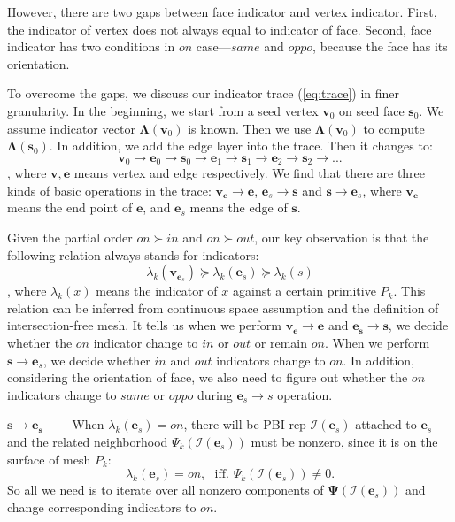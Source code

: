\documentclass[10pt,journal,compsoc]{IEEEtran}
\begin{document}
However, there are two gaps between face indicator and vertex indicator. First, the indicator of vertex does not always equal to indicator of face. Second, face indicator has two conditions in $on$ case---$same$ and $oppo$, because the face has its orientation.

To overcome the gaps, we discuss our indicator trace (\ref{eq:trace}) in finer granularity. In the beginning, we start from a seed vertex $\bm{v}_0$ on seed face $\bm{s}_0$. We assume indicator vector $\bm{\Lambda}(\bm{v}_0)$ is known. Then we use $\bm{\Lambda}(\bm{v}_0)$ to compute $\bm{\Lambda}(\bm{s}_0)$. In addition, we add the edge layer into the trace. Then it changes to:
\begin{equation}
\bm{v}_0\to \bm{e}_0\to \bm{s}_0\to \bm{e}_1\to \bm{s}_1\to \bm{e}_2\to \bm{s}_2\to ...
\end{equation}
, where $\bm{v}, \bm{e}$ means vertex and edge respectively. We find that there are three kinds of basic operations in the trace: $\bm{v}_{\bm{e}}\to \bm{e}$, $\bm{e}_s\to \bm{s}$ and $\bm{s}\to \bm{e}_s$, where $\bm{v}_{\bm{e}}$ means the end point of $\bm{e}$, and $\bm{e}_s$ means the edge of $\bm{s}$.

Given the partial order $on \succ in$ and $on \succ out$, our key observation is that the following relation always stands for indicators:
\begin{equation}
\label{eq:porder}
\lambda_k(\bm{v}_{\bm{e}_s}) \succeq \lambda_k(\bm{e}_s) \succeq \lambda_k(s)
\end{equation}
, where $\lambda_k(x)$ means the indicator of $x$ against a certain primitive $P_k$. This relation can be inferred from continuous space assumption and the definition of intersection-free mesh. It tells us when we perform $\bm{v}_{\bm{e}}\to \bm{e}$ and $\bm{e}_{\bm{s}}\to \bm{s}$, we decide whether the $on$ indicator change to $in$ or $out$ or remain $on$. When we perform $\bm{s}\to \bm{e}_s$, we decide whether $in$ and $out$ indicators change to $on$. In addition, considering the orientation of face, we also need to figure out whether the $on$ indicators change to $same$ or $oppo$ during $\bm{e}_s\to s$ operation.

\vspace{0.5em}
\noindent\textbf{$\bm{s\to \bm{e}_s}$}~~~~ When $\lambda_k(\bm{e}_s)=on$, there will be PBI-rep $\bm{\mathcal{I}}(\bm{e}_s)$ attached to $\bm{e}_s$ and the related neighborhood $\Psi_k(\bm{\mathcal{I}}(\bm{e}_s))$ must be nonzero, since it is on the surface of mesh $P_k$:
\begin{equation}
\label{eq:eq1}
\lambda_k(\bm{e}_s)=on,\ \ \  \mbox{iff. }\Psi_k(\bm{\mathcal{I}}(\bm{e}_s))\neq 0.
\end{equation}
So all we need is to iterate over all nonzero components of $\bm{\Psi}(\bm{\mathcal{I}}(\bm{e}_s))$ and change corresponding indicators to $on$.
\end{document}
